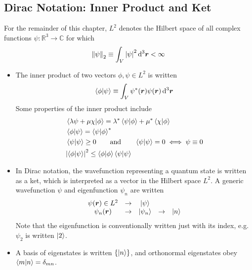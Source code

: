 \documentclass[11pt, a4paper]{article}
\newcommand{\diff}{\mathop{}\!\mathrm{d}} %
\newcommand{\dr}{\diff^{3} \r}  %
\newcommand{\eqtext}[1]{\qquad \text{#1} \qquad}
\renewcommand{\vec}[1]{\bm{#1}}  %
\renewcommand{\r}{\vec{r}}  %
\newcommand{\p}{\psi}  %
\begin{document}
\subsection{Dirac Notation: Inner Product and Ket}
For the remainder of this chapter, $ L^{2} $ denotes the Hilbert space of all complex functions $ \psi : \mathbb{R}^{3} \to \mathbb{C} $ for which
\begin{equation*}
	\norm{\psi}_{2} \equiv \int_{V} \abs{\psi}^{2} \dr < \infty
\end{equation*}
\begin{itemize}
	\item The inner product of two vectors $ \phi, \psi \in L^{2} $ is written
	\begin{equation*}
		\braket{\phi}{\psi} \equiv \int_{V}\psi^{*}(\r)\psi(\r)\dr
	\end{equation*}
	Some properties of the inner product include
	\begin{align*}
		& \braket{\lambda \psi + \mu \chi}{\phi} = \lambda^{*} \braket{\psi}{\phi} + \mu^{*} \braket{\chi}{\phi}\\
		&\braket{\phi}{\psi} = \braket{\psi}{\phi}^{*}\\
		& \braket{\psi}{\psi} \geq 0 \eqtext{and} \braket{\psi}{\psi} = 0 \iff \psi \equiv 0 \\
		&\abs{\braket{\phi}{\psi}}^{2} \leq \braket{\phi}{\phi}\braket{\p}{\p}
	\end{align*}
	
	\item In Dirac notation, the wavefunction representing a quantum state is written as a ket, which is interpreted as a vector in the Hilbert space $ L^{2} $. A generic wavefunction $ \psi $ and eigenfunction $ \psi_{n} $ are written
	\begin{equation*}
		\begin{array}{ccccc}
			\psi(\r) \in L^{2} & \to & \ket{\p} & & \\
			\psi_{n}(\r) & \to  & \ket{\psi_{n}} & \to & \ket{n}\\
		\end{array}
	\end{equation*}
	Note that the eigenfunction is conventionally written just with its index, e.g. $ \psi_{2} $ is written $ \ket{2} $.
	
	\item A basis of eigenstates is written $ \{\ket{n}\} $, and orthonormal eigenstates obey $ \braket{m}{n} = \delta_{mn} $. 
		
\end{itemize}
\end{document}

